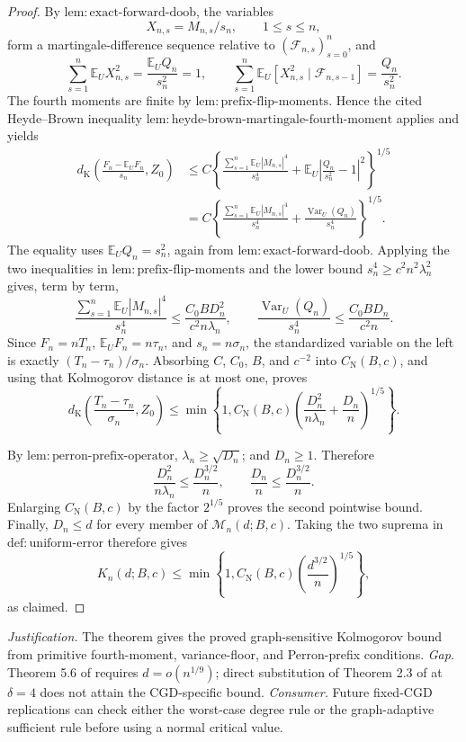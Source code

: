 \documentclass{article}
\begin{document}
\begin{proof}
By \(\mathrm{lem:exact\text{-}forward\text{-}doob}\), the variables
\[
 X_{n,s}=M_{n,s}/s_n,\qquad 1\le s\le n,
\]
form a martingale-difference sequence relative to \((\mathcal F_{n,s})_{s=0}^n\), and
\[
 \sum_{s=1}^n\mathbb E_UX_{n,s}^2
 =\frac{\mathbb E_UQ_n}{s_n^2}=1,
 \qquad
 \sum_{s=1}^n\mathbb E_U[X_{n,s}^2\mid\mathcal F_{n,s-1}]
 =\frac{Q_n}{s_n^2}.
\]
The fourth moments are finite by \(\mathrm{lem:prefix\text{-}flip\text{-}moments}\).  Hence the cited Heyde--Brown inequality \(\mathrm{lem:heyde\text{-}brown\text{-}martingale\text{-}fourth\text{-}moment}\) applies and yields
\[
 \begin{aligned}
 d_{\mathrm K}\left(\frac{F_n-\mathbb E_UF_n}{s_n},Z_0\right)
 &\le C\left\{
 \frac{\sum_{s=1}^n\mathbb E_U|M_{n,s}|^4}{s_n^4}
 +\mathbb E_U\left|\frac{Q_n}{s_n^2}-1\right|^2
 \right\}^{1/5}\\
 &=C\left\{
 \frac{\sum_{s=1}^n\mathbb E_U|M_{n,s}|^4}{s_n^4}
 +\frac{\operatorname{Var}_U(Q_n)}{s_n^4}
 \right\}^{1/5}.
 \end{aligned}
\]
The equality uses \(\mathbb E_UQ_n=s_n^2\), again from \(\mathrm{lem:exact\text{-}forward\text{-}doob}\).  Applying the two inequalities in \(\mathrm{lem:prefix\text{-}flip\text{-}moments}\) and the lower bound \(s_n^4\ge c^2n^2\lambda_n^2\) gives, term by term,
\[
 \frac{\sum_{s=1}^n\mathbb E_U|M_{n,s}|^4}{s_n^4}
 \le \frac{C_0B D_n^2}{c^2n\lambda_n},
 \qquad
 \frac{\operatorname{Var}_U(Q_n)}{s_n^4}
 \le \frac{C_0B D_n}{c^2n}.
\]
Since \(F_n=nT_n\), \(\mathbb E_UF_n=n\tau_n\), and \(s_n=n\sigma_n\), the standardized variable on the left is exactly \((T_n-\tau_n)/\sigma_n\).  Absorbing \(C\), \(C_0\), \(B\), and \(c^{-2}\) into \(C_{\mathrm N}(B,c)\), and using that Kolmogorov distance is at most one, proves
\[
 d_{\mathrm K}\left(\frac{T_n-\tau_n}{\sigma_n},Z_0\right)
 \le \min\left\{1,C_{\mathrm N}(B,c)
 \left(\frac{D_n^2}{n\lambda_n}+\frac{D_n}{n}\right)^{1/5}\right\}.
\]

By \(\mathrm{lem:perron\text{-}prefix\text{-}operator}\), \(\lambda_n\ge\sqrt{D_n}\); and \(D_n\ge1\).  Therefore
\[
 \frac{D_n^2}{n\lambda_n}\le\frac{D_n^{3/2}}n,
 \qquad
 \frac{D_n}{n}\le\frac{D_n^{3/2}}n.
\]
Enlarging \(C_{\mathrm N}(B,c)\) by the factor \(2^{1/5}\) proves the second pointwise bound.  Finally, \(D_n\le d\) for every member of \(\mathcal M_n(d;B,c)\).  Taking the two suprema in \(\mathrm{def:uniform\text{-}error}\) therefore gives
\[
 K_n(d;B,c)\le\min\left\{1,C_{\mathrm N}(B,c)
 \left(\frac{d^{3/2}}n\right)^{1/5}\right\},
\]
as claimed.
\end{proof}
\par\smallskip\noindent \textit{Justification.} The theorem gives the proved graph-sensitive Kolmogorov bound from primitive fourth-moment, variance-floor, and Perron-prefix conditions. \textit{Gap.} Theorem 5.6 of \cite{KandirosPipisDaskalakisHarshaw2024CGD} requires \(d=o(n^{1/9})\); direct substitution of Theorem 2.3 of \cite{JanischLehericy2024SparseDependencyGraph} at \(\delta=4\) does not attain the CGD-specific bound. \textit{Consumer.} Future fixed-CGD replications can check either the worst-case degree rule or the graph-adaptive sufficient rule before using a normal critical value.
\end{document}
